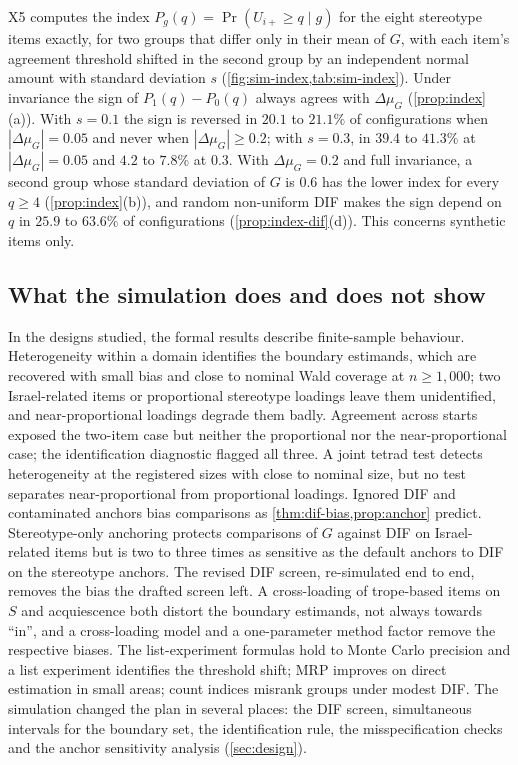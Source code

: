 \label{sec:sim-index}X5 computes the index $P_g(q)=\Pr(U_{i+}\ge q\mid g)$ for the eight stereotype items exactly, for two groups that differ only in their mean of $G$, with each item's agreement threshold shifted in the second group by an independent normal amount with standard deviation $s$ (\cref{fig:sim-index,tab:sim-index}). Under invariance the sign of $P_1(q)-P_0(q)$ always agrees with $\Delta\mu_G$ (\cref{prop:index}(a)). With $s=0.1$ the sign is reversed in $20.1$ to $21.1\%$ of configurations when $|\Delta\mu_G|=0.05$ and never when $|\Delta\mu_G|\ge0.2$; with $s=0.3$, in $39.4$ to $41.3\%$ at $|\Delta\mu_G|=0.05$ and $4.2$ to $7.8\%$ at $0.3$. With $\Delta\mu_G=0.2$ and full invariance, a second group whose standard deviation of $G$ is $0.6$ has the lower index for every $q\ge4$ (\cref{prop:index}(b)), and random non-uniform DIF makes the sign depend on $q$ in $25.9$ to $63.6\%$ of configurations (\cref{prop:index-dif}(d)). This concerns synthetic items only.

\subsection{What the simulation does and does not show}\label{sec:sim-limits}

In the designs studied, the formal results describe finite-sample behaviour. Heterogeneity within a domain identifies the boundary estimands, which are recovered with small bias and close to nominal Wald coverage at $n\ge1{,}000$; two Israel-related items or proportional stereotype loadings leave them unidentified, and near-proportional loadings degrade them badly. Agreement across starts exposed the two-item case but neither the proportional nor the near-proportional case; the identification diagnostic flagged all three. A joint tetrad test detects heterogeneity at the registered sizes with close to nominal size, but no test separates near-proportional from proportional loadings. Ignored DIF and contaminated anchors bias comparisons as \cref{thm:dif-bias,prop:anchor} predict. Stereotype-only anchoring protects comparisons of $G$ against DIF on Israel-related items but is two to three times as sensitive as the default anchors to DIF on the stereotype anchors. The revised DIF screen, re-simulated end to end, removes the bias the drafted screen left. A cross-loading of trope-based items on $S$ and acquiescence both distort the boundary estimands, not always towards ``in'', and a cross-loading model and a one-parameter method factor remove the respective biases. The list-experiment formulas hold to Monte Carlo precision and a list experiment identifies the threshold shift; MRP improves on direct estimation in small areas; count indices misrank groups under modest DIF. The simulation changed the plan in several places: the DIF screen, simultaneous intervals for the boundary set, the identification rule, the misspecification checks and the anchor sensitivity analysis (\cref{sec:design}).

